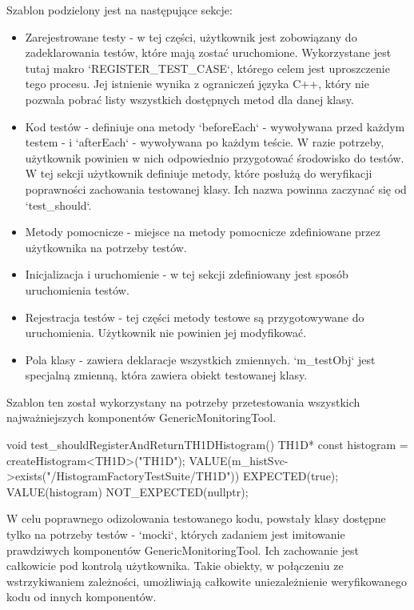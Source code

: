 Szablon podzielony jest na następujące sekcje:
\begin{itemize}
\item Zarejestrowane testy - w tej części, użytkownik jest zobowiązany do zadeklarowania testów, które mają zostać uruchomione. Wykorzystane jest tutaj makro `REGISTER\_TEST\_CASE`, którego celem jest uproszczenie tego procesu. Jej istnienie wynika z ograniczeń języka C++, który nie pozwala pobrać listy wszystkich dostępnych metod dla danej klasy.
\item Kod testów - definiuje ona metody `beforeEach` - wywoływana przed każdym testem - i `afterEach` - wywoływana po każdym teście. W razie potrzeby, użytkownik powinien w nich odpowiednio przygotować środowisko do testów. W tej sekcji użytkownik definiuje metody, które posłużą do weryfikacji poprawności zachowania testowanej klasy. Ich nazwa powinna zaczynać się od `test\_should`.
\item Metody pomocnicze - miejsce na metody pomocnicze zdefiniowane przez użytkownika na potrzeby testów.
\item Inicjalizacja i uruchomienie - w tej sekcji zdefiniowany jest sposób uruchomienia testów.
\item Rejestracja testów - tej części metody testowe są przygotowywane do uruchomienia. Użytkownik nie powinien jej modyfikować.  
\item Pola klasy - zawiera deklaracje wszystkich zmiennych. `m\_testObj` jest specjalną zmienną, która zawiera obiekt testowanej klasy.  
\end{itemize}

Szablon ten został wykorzystany na potrzeby przetestowania wszystkich najważniejszych komponentów GenericMonitoringTool.

\begin{cpp}[caption=Jeden z testów zdefiniowanych w ramach HistogramFactoryTestSuite~\cite{histogram-factory-test-suite}, label={lst:athena:histogram_factory_test_suite}]
void test_shouldRegisterAndReturnTH1DHistogram() {
   TH1D* const histogram = createHistogram<TH1D>("TH1D");
   VALUE(m_histSvc->exists("/HistogramFactoryTestSuite/TH1D")) EXPECTED(true);
   VALUE(histogram) NOT_EXPECTED(nullptr);
    }
\end{cpp}

W celu poprawnego odizolowania testowanego kodu, powstały klasy dostępne tylko na potrzeby testów - `mocki`, których zadaniem jest imitowanie prawdziwych komponentów GenericMonitoringTool.
Ich zachowanie jest całkowicie pod kontrolą użytkownika.
Takie obiekty, w połączeniu ze wstrzykiwaniem zależności, umożliwiają całkowite uniezależnienie weryfikowanego kodu od innych komponentów.
